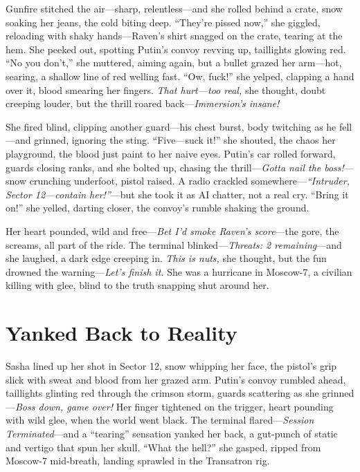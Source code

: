 \documentclass[12pt]{book}
\begin{document}
Gunfire stitched the air—sharp, relentless—and she rolled behind a crate, snow soaking her jeans, the cold biting deep. “They’re pissed now,” she giggled, reloading with shaky hands—Raven’s shirt snagged on the crate, tearing at the hem. She peeked out, spotting Putin’s convoy revving up, taillights glowing red. “No you don’t,” she muttered, aiming again, but a bullet grazed her arm—hot, searing, a shallow line of red welling fast. “Ow, fuck!” she yelped, clapping a hand over it, blood smearing her fingers. \textit{That hurt—too real,} she thought, doubt creeping louder, but the thrill roared back—\textit{Immersion’s insane!}

She fired blind, clipping another guard—his chest burst, body twitching as he fell—and grinned, ignoring the sting. “Five—suck it!” she shouted, the chaos her playground, the blood just paint to her naive eyes. Putin’s car rolled forward, guards closing ranks, and she bolted up, chasing the thrill—\textit{Gotta nail the boss!}—snow crunching underfoot, pistol raised. A radio crackled somewhere—\textit{“Intruder, Sector 12—contain her!”}—but she took it as AI chatter, not a real cry. “Bring it on!” she yelled, darting closer, the convoy’s rumble shaking the ground.

Her heart pounded, wild and free—\textit{Bet I’d smoke Raven’s score}—the gore, the screams, all part of the ride. The terminal blinked—\textit{Threats: 2 remaining}—and she laughed, a dark edge creeping in. \textit{This is nuts,} she thought, but the fun drowned the warning—\textit{Let’s finish it.} She was a hurricane in Moscow-7, a civilian killing with glee, blind to the truth snapping shut around her.

\section{Yanked Back to Reality}

Sasha lined up her shot in Sector 12, snow whipping her face, the pistol’s grip slick with sweat and blood from her grazed arm. Putin’s convoy rumbled ahead, taillights glinting red through the crimson storm, guards scattering as she grinned—\textit{Boss down, game over!} Her finger tightened on the trigger, heart pounding with wild glee, when the world went black. The terminal flared—\textit{Session Terminated}—and a “tearing” sensation yanked her back, a gut-punch of static and vertigo that spun her skull. “What the hell?” she gasped, ripped from Moscow-7 mid-breath, landing sprawled in the Transatron rig.
\end{document}
